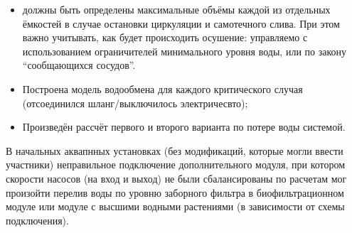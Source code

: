 \begin{enumerate}
\begin{itemize}
                \item должны быть определены максимальные объёмы каждой из отдельных ёмкостей в случае остановки циркуляции и самотечного слива. При этом важно учитывать, как будет происходить осушение: управляемо с использованием ограничителей минимального уровня воды, или по закону “сообщающихся сосудов”. 
                
                \item Построена модель водообмена для каждого критического случая (отсоединился шланг/выключилось электричесвто);
                
                \item Произведён рассчёт первого и второго варианта по потере воды системой.
            \end{itemize}    

\end{enumerate}

В начальных аквапнных установках (без модификаций, которые могли ввести участники) неправильное подключение дополнительного модуля, при котором скорости насосов (на вход и выход) не были сбалансированы по расчетам мог произойти  перелив воды по уровню заборного фильтра в биофильтрационном модуле или модуле с высшими водными растениями (в зависимости от схемы подключения). 